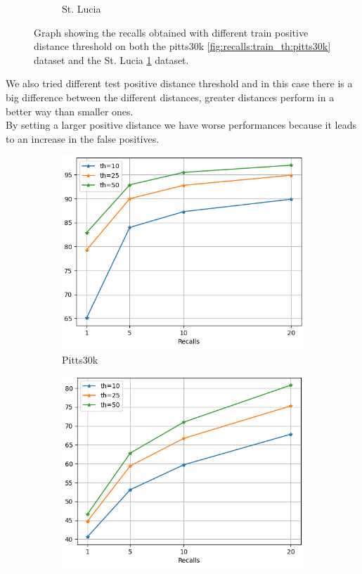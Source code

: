 \documentclass[10pt,twocolumn,letterpaper]{article}
\begin{document}
\begin{figure}[!h]
\begin{subfigure}[b]{0.23\textwidth}
		\caption{St. Lucia}
		\label{fig:recalls:train_th:st_lucia}
	\end{subfigure}
	\caption{Graph showing the recalls obtained with different train positive distance threshold on both the pitts30k \ref{fig:recalls:train_th:pitts30k} dataset and the St. Lucia \ref{fig:recalls:train_th:st_lucia} dataset.}
	\label{fig:recalls:train_th}
\end{figure}
We also tried different test positive distance threshold and in this case there is a big difference between the different distances, greater distances perform in a better way than smaller ones.\\
By setting a larger positive distance we have worse performances because it leads to an increase in the false positives.
\begin{figure}[!h]
	\centering
	\begin{subfigure}[b]{0.23\textwidth}
		\centering
		\includegraphics[width=\textwidth]{img/test_th/test_pitts30k_recalls_graph.png}
		\caption{Pitts30k}
		\label{fig:recalls:test_th:pitts30k}
	\end{subfigure}
	\hfill
	\begin{subfigure}[b]{0.23\textwidth}
		\centering
		\includegraphics[width=\textwidth]{img/test_th/test_st_lucia_recalls_graph.png}

\end{subfigure}
\end{figure}
\end{document}
